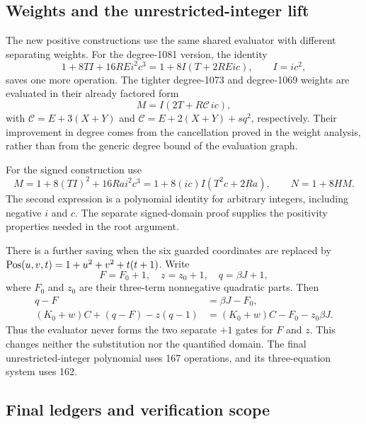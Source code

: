 \subsection{Weights and the unrestricted-integer lift}

The new positive constructions use the same shared evaluator with different
separating weights. For the degree-1081 version, the identity
\[
 1+8TI+16REi^2c^3=1+8I(T+2REic),\qquad I=ic^2,
\]
saves one more operation. The tighter degree-1073 and degree-1069 weights
are evaluated in their already factored form
\[
 M=I(2T+R\mathcal C\,ic),
\]
with $\mathcal C=E+3(X+Y)$ and
$\mathcal C=E+2(X+Y)+sq^2$, respectively. Their improvement in degree
comes from the cancellation proved in the weight analysis, rather than
from the generic degree bound of the evaluation graph.

For the signed construction use
\[
 M=1+8(TI)^2+16Ra i^2c^3
   =1+8(ic)I(T^2c+2Ra),\qquad N=1+8HM.
\]
The second expression is a polynomial identity for arbitrary integers,
including negative $i$ and $c$. The separate signed-domain proof supplies
the positivity properties needed in the root argument.

There is a further saving when the six guarded coordinates are replaced by
$\operatorname{Pos}(u,v,t)=1+u^2+v^2+t(t+1)$. Write
\[
 F=F_0+1,\quad z=z_0+1,\quad q=\beta J+1,
\]
where $F_0$ and $z_0$ are their three-term nonnegative quadratic parts.
Then
\begin{align*}
 q-F&=\beta J-F_0,\\
 (K_0+w)C+(q-F)-z(q-1)
   &=(K_0+w)C-F_0-z_0\beta J.
\end{align*}
Thus the evaluator never forms the two separate $+1$ gates for $F$ and
$z$. This changes neither the substitution nor the quantified domain.
The final unrestricted-integer polynomial uses 167 operations, and its
three-equation system uses 162.

\subsection{Final ledgers and verification scope}

